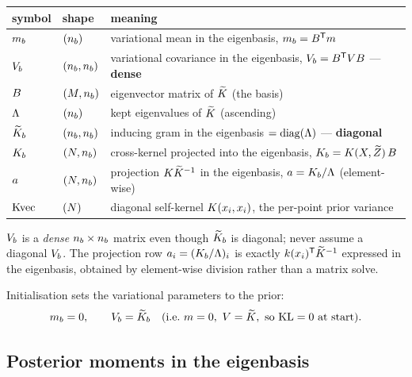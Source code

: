 \begin{center}\small
\begin{tabular}{@{}l l >{\raggedright\arraybackslash}p{8.6cm}@{}}
\toprule
symbol & shape & meaning \\
\midrule
$m_{b}$ & $(n_{b})$ & variational mean in the eigenbasis, $m_{b}=B^{\mathsf{T}}m$ \\
$V_{b}$ & $(n_{b},n_{b})$ & variational covariance in the eigenbasis, $V_{b}=B^{\mathsf{T}}VB$ --- \textbf{dense} \\
$B$ & $(M,n_{b})$ & eigenvector matrix of $\widetilde{K}$ (the basis) \\
$\Lambda$ & $(n_{b})$ & kept eigenvalues of $\widetilde{K}$ (ascending) \\
$\widetilde{K}_{b}$ & $(n_{b},n_{b})$ & inducing gram in the eigenbasis $=\operatorname{diag}(\Lambda)$ --- \textbf{diagonal} \\
$K_b$ & $(N,n_{b})$ & cross-kernel projected into the eigenbasis, $K_b=K(X,\widetilde{Z})\,B$ \\
$a$ & $(N,n_{b})$ & projection $K\widetilde{K}^{-1}$ in the eigenbasis, $a=K_b/\Lambda$ (element-wise) \\
$\mathrm{Kvec}$ & $(N)$ & diagonal self-kernel $K(x_i,x_i)$, the per-point prior variance \\
\bottomrule
\end{tabular}
\end{center}

\begin{remark}
$V_{b}$ is a \emph{dense} $n_{b}\times n_{b}$ matrix even though $\widetilde{K}_{b}$ is diagonal;
never assume a diagonal $V_{b}$. The projection row $a_i=(K_b/\Lambda)_i$
is exactly $k(x_i)^{\mathsf{T}}\widetilde{K}^{-1}$ expressed in the eigenbasis, obtained
by element-wise division rather than a matrix solve.
\end{remark}

Initialisation sets the variational parameters to the prior:
\begin{equation}
  \mb=0,\qquad \Vb=\Ktilb \quad(\text{i.e.\ }\vm=0,\ \vV=\Ktil,\ \text{so } \KLdiv=0\text{ at start}).
\end{equation}

\subsection{Posterior moments in the eigenbasis}\label{sec:eig-moments}

